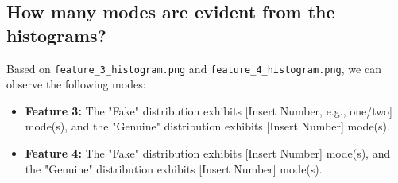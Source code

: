 \subsection*{How many modes are evident from the histograms?}
Based on \texttt{feature\_3\_histogram.png} and \texttt{feature\_4\_histogram.png}, we can observe the following modes:
\begin{itemize}
    \item \textbf{Feature 3:} The "Fake" distribution exhibits [Insert Number, e.g., one/two] mode(s), and the "Genuine" distribution exhibits [Insert Number] mode(s).
    \item \textbf{Feature 4:} The "Fake" distribution exhibits [Insert Number] mode(s), and the "Genuine" distribution exhibits [Insert Number] mode(s).
\end{itemize}
